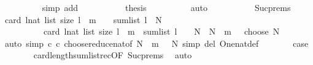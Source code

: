 \begin{isabellebody}
\ \ \ \ \ \ \ \ \isamarkupfalse%
\ {\isacharparenleft}{\kern0pt}simp\ add{\isacharcolon}{\kern0pt}\ {\isacharasterisk}{\kern0pt}{\isacharparenright}{\kern0pt}\isanewline
\ \ \ \ \ \ \isamarkupfalse%
\ \isamarkupfalse%
\ {\isacharquery}{\kern0pt}thesis\isanewline
\ \ \ \ \ \ \ \ \isamarkupfalse%
\ auto\isanewline
\ \ \ \ \isamarkupfalse%
\isanewline
\ \ \ \ \isamarkupfalse%
\ Suc{\isachardot}{\kern0pt}prems\ \isamarkupfalse%
\ {\isachardoublequoteopen}{\isacharparenleft}{\kern0pt}card\ {\isacharbraceleft}{\kern0pt}l{\isacharcolon}{\kern0pt}{\isacharcolon}{\kern0pt}nat\ list{\isachardot}{\kern0pt}\ size\ l\ {\isacharequal}{\kern0pt}\ {\isacharparenleft}{\kern0pt}m\ {\isacharminus}{\kern0pt}\ {}{\isacharparenright}{\kern0pt}\ {\isasymand}\ sum{\isacharunderscore}{\kern0pt}list\ l\ {\isacharequal}{\kern0pt}\ N{\isacharbraceright}{\kern0pt}\ {\isacharplus}{\kern0pt}\isanewline
\ \ \ \ \ \ \ \ \ \ card\ {\isacharbraceleft}{\kern0pt}l{\isacharcolon}{\kern0pt}{\isacharcolon}{\kern0pt}nat\ list{\isachardot}{\kern0pt}\ size\ l\ {\isacharequal}{\kern0pt}\ m\ {\isasymand}\ sum{\isacharunderscore}{\kern0pt}list\ l\ {\isacharplus}{\kern0pt}\ {}\ {\isacharequal}{\kern0pt}\ N{\isacharbraceright}{\kern0pt}{\isacharparenright}{\kern0pt}\ {\isacharequal}{\kern0pt}\ {\isacharparenleft}{\kern0pt}N\ {\isacharplus}{\kern0pt}\ m\ {\isacharminus}{\kern0pt}\ {}{\isacharparenright}{\kern0pt}\ choose\ N{\isachardoublequoteclose}\isanewline
\ \ \ \ \ \ \isamarkupfalse%
\ {\isacharparenleft}{\kern0pt}auto\ simp{\isacharcolon}{\kern0pt}\ c{}\ c{}\ choose{\isacharunderscore}{\kern0pt}reduce{\isacharunderscore}{\kern0pt}nat{\isacharbrackleft}{\kern0pt}of\ {\isachardoublequoteopen}N\ {\isacharplus}{\kern0pt}\ m\ {\isacharminus}{\kern0pt}\ {}{\isachardoublequoteclose}\ N{\isacharbrackright}{\kern0pt}\ simp\ del{\isacharcolon}{\kern0pt}\ One{\isacharunderscore}{\kern0pt}nat{\isacharunderscore}{\kern0pt}def{\isacharparenright}{\kern0pt}\isanewline
\ \ \ \ \isamarkupfalse%
\ \isamarkupfalse%
\ {\isacharquery}{\kern0pt}case\isanewline
\ \ \ \ \ \ \isamarkupfalse%
\ card{\isacharunderscore}{\kern0pt}length{\isacharunderscore}{\kern0pt}sum{\isacharunderscore}{\kern0pt}list{\isacharunderscore}{\kern0pt}rec{\isacharbrackleft}{\kern0pt}OF\ Suc{\isachardot}{\kern0pt}prems{\isacharbrackright}{\kern0pt}\ \isamarkupfalse%
\ auto\isanewline

\end{isabellebody}
